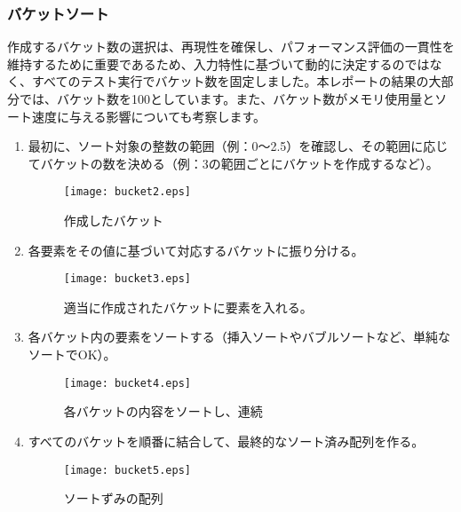 \documentclass[a4j, 12pt]{jarticle}
\begin{document}
\subsubsection{バケットソート}
作成するバケット数の選択は、再現性を確保し、パフォーマンス評価の一貫性を維持するために重要であるため、入力特性に基づいて動的に決定するのではなく、すべてのテスト実行でバケット数を固定しました。本レポートの結果の大部分では、バケット数を100としています。また、バケット数がメモリ使用量とソート速度に与える影響についても考察します。\cite{gfg:bucketsort2024}\\
\begin{enumerate}
  \begin{figure}[H]
    \centering
    \texttt{[image: bucket1.eps]}
    \caption{ソート対象データ}
  \end{figure}
  \item 最初に、ソート対象の整数の範囲（例：0〜2.5）を確認し、その範囲に応じてバケットの数を決める（例：3の範囲ごとにバケットを作成するなど）。
  \begin{figure}[H]
    \centering
    \texttt{[image: bucket2.eps]}
    \caption{作成したバケット}
  \end{figure}
  \item 各要素をその値に基づいて対応するバケットに振り分ける。
  \begin{figure}[H]
    \centering
    \texttt{[image: bucket3.eps]}
    \caption{適当に作成されたバケットに要素を入れる。}
  \end{figure}
  \newpage
  \item 各バケット内の要素をソートする（挿入ソートやバブルソートなど、単純なソートでOK）。
  \begin{figure}[H]
    \centering
    \texttt{[image: bucket4.eps]}
    \caption{各バケットの内容をソートし、連続}
  \end{figure}
  \item すべてのバケットを順番に結合して、最終的なソート済み配列を作る。
  \begin{figure}[H]
    \centering
    \texttt{[image: bucket5.eps]}
    \caption{ソートずみの配列}
  \end{figure}
\end{enumerate}
\end{document}
